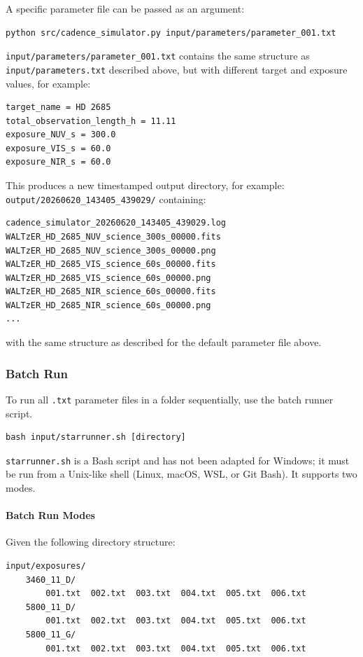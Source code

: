 A specific parameter file can be passed as an argument:

\begin{verbatim}
python src/cadence_simulator.py input/parameters/parameter_001.txt
\end{verbatim}

\texttt{input/parameters/parameter\_001.txt} contains the same structure as \texttt{input/parameters.txt} described above, but with different target and exposure values, for example:

\begin{verbatim}
target_name = HD 2685
total_observation_length_h = 11.11
exposure_NUV_s = 300.0
exposure_VIS_s = 60.0
exposure_NIR_s = 60.0
\end{verbatim}

This produces a new timestamped output directory, for example: \texttt{output/20260620\_143405\_439029/} containing:

\begin{verbatim}
cadence_simulator_20260620_143405_439029.log
WALTzER_HD_2685_NUV_science_300s_00000.fits
WALTzER_HD_2685_NUV_science_300s_00000.png
WALTzER_HD_2685_VIS_science_60s_00000.fits
WALTzER_HD_2685_VIS_science_60s_00000.png
WALTzER_HD_2685_NIR_science_60s_00000.fits
WALTzER_HD_2685_NIR_science_60s_00000.png
...
\end{verbatim}

with the same structure as described for the default parameter file above.

\subsubsection{Batch Run}
\label{sec:batch_run}
To run all \texttt{.txt} parameter files in a folder sequentially, use the batch runner script.
\begin{verbatim}
bash input/starrunner.sh [directory]
\end{verbatim}

\texttt{starrunner.sh} is a Bash script and has not been adapted for Windows; it must be run from a Unix-like shell (Linux, macOS, WSL, or Git Bash). It supports two modes.

\paragraph{Batch Run Modes}

Given the following directory structure:

\begin{verbatim}
input/exposures/
    3460_11_D/
        001.txt  002.txt  003.txt  004.txt  005.txt  006.txt
    5800_11_D/
        001.txt  002.txt  003.txt  004.txt  005.txt  006.txt
    5800_11_G/
        001.txt  002.txt  003.txt  004.txt  005.txt  006.txt
\end{verbatim}

